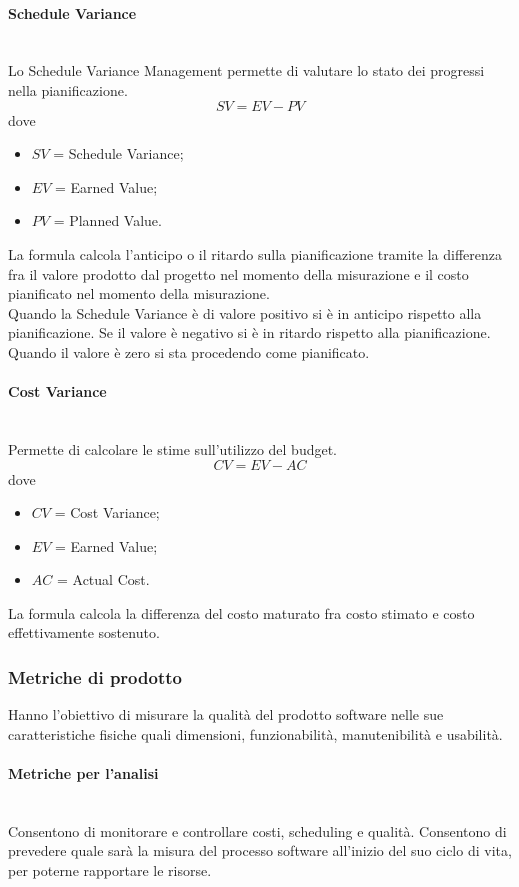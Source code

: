 \paragraph{Schedule Variance}\mbox{}\\
Lo Schedule Variance Management permette di valutare lo stato dei progressi nella pianificazione. 
\[ SV=EV-PV \]
dove
\begin{itemize}
	\item $SV$ = Schedule Variance;
	\item $EV$ = Earned Value;
	\item $PV$ = Planned Value.
\end{itemize}
La formula calcola l'anticipo o il ritardo sulla pianificazione tramite la differenza fra il valore prodotto dal progetto nel momento della misurazione e il costo pianificato nel momento della misurazione.\\
Quando la Schedule Variance è di valore positivo si è in anticipo rispetto alla pianificazione. Se il valore è negativo si è in ritardo rispetto alla pianificazione. Quando il valore è zero si sta procedendo come pianificato.

\paragraph{Cost Variance}\mbox{}\\
Permette di calcolare le stime sull'utilizzo del budget. 
\[ CV=EV-AC \]
dove
\begin{itemize}
	\item $CV$ = Cost Variance;
	\item $EV$ = Earned Value;
	\item $AC$ = Actual Cost.
\end{itemize}
La formula calcola la differenza del costo maturato fra costo stimato e costo effettivamente sostenuto.

\subsubsection{Metriche di prodotto}
Hanno l'obiettivo di misurare la qualità del prodotto software nelle sue caratteristiche fisiche quali dimensioni, funzionabilità, manutenibilità e usabilità.

\paragraph{Metriche per l'analisi}\mbox{}\\
Consentono di monitorare e controllare costi, scheduling e qualità. Consentono di prevedere quale sarà la misura del processo software all'inizio del suo ciclo di vita, per poterne rapportare le risorse.


